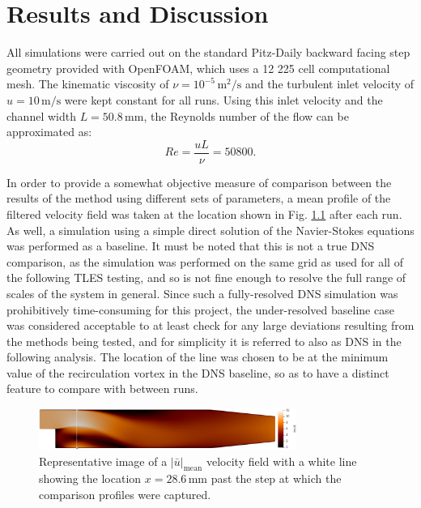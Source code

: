 \chapter{Results and Discussion}


All simulations were carried out on the standard Pitz-Daily backward facing step geometry provided with OpenFOAM, which uses a 12 225 cell computational mesh. The kinematic viscosity of $\nu=10^{-5}\,\mathrm{m}^2/\mathrm{s}$ and the turbulent inlet velocity of $u=10\,\mathrm{m}/\mathrm{s}$ were kept constant for all runs. Using this inlet velocity and the channel width $L=50.8\,\mathrm{mm}$, the Reynolds number of the flow can be approximated as: $$ Re=\frac{uL}{\nu}=50800.$$

In order to provide a somewhat objective measure of comparison between the results of the method using different sets of parameters, a mean profile of the filtered velocity field was taken at the location shown in Fig. \ref{fig:line_location} after each run. As well, a simulation using a simple direct solution of the Navier-Stokes equations was performed as a baseline. It must be noted that this is not a true DNS comparison, as the simulation was performed on the same grid as used for all of the following TLES testing, and so is not fine enough to resolve the full range of scales of the system in general. Since such a fully-resolved DNS simulation was prohibitively time-consuming for this project, the under-resolved baseline case was considered acceptable to at least check for any large deviations resulting from the methods being tested, and for simplicity it is referred to also as DNS in the following analysis. The location of the line was chosen to be at the minimum value of the recirculation vortex in the DNS baseline, so as to have a distinct feature to compare with between runs.

\begin{figure}[!b]
\centering
\includegraphics[width=0.75\textwidth]{figures/line_location.pdf}
\caption{Representative image of a $|\bar{u}|_{\mathrm{mean}}$ velocity field with a white line showing the location $x=28.6\,\mathrm{mm}$ past the step at which the comparison profiles were captured.}
\label{fig:line_location}
\end{figure}

